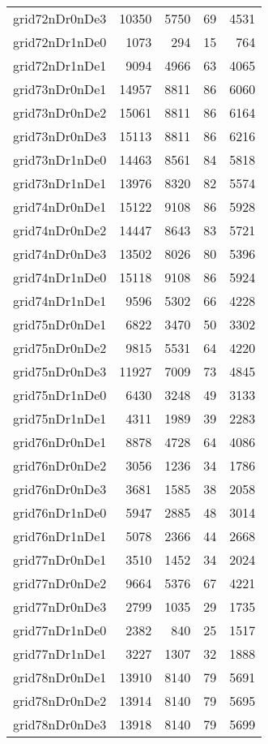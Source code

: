 \begin{longtable}{lrrrr}
grid72nDr0nDe3 & 10350 & 5750 & 69 & 4531 \\
grid72nDr1nDe0 & 1073 & 294 & 15 & 764 \\
grid72nDr1nDe1 & 9094 & 4966 & 63 & 4065 \\
grid73nDr0nDe1 & 14957 & 8811 & 86 & 6060 \\
grid73nDr0nDe2 & 15061 & 8811 & 86 & 6164 \\
grid73nDr0nDe3 & 15113 & 8811 & 86 & 6216 \\
grid73nDr1nDe0 & 14463 & 8561 & 84 & 5818 \\
grid73nDr1nDe1 & 13976 & 8320 & 82 & 5574 \\
grid74nDr0nDe1 & 15122 & 9108 & 86 & 5928 \\
grid74nDr0nDe2 & 14447 & 8643 & 83 & 5721 \\
grid74nDr0nDe3 & 13502 & 8026 & 80 & 5396 \\
grid74nDr1nDe0 & 15118 & 9108 & 86 & 5924 \\
grid74nDr1nDe1 & 9596 & 5302 & 66 & 4228 \\
grid75nDr0nDe1 & 6822 & 3470 & 50 & 3302 \\
grid75nDr0nDe2 & 9815 & 5531 & 64 & 4220 \\
grid75nDr0nDe3 & 11927 & 7009 & 73 & 4845 \\
grid75nDr1nDe0 & 6430 & 3248 & 49 & 3133 \\
grid75nDr1nDe1 & 4311 & 1989 & 39 & 2283 \\
grid76nDr0nDe1 & 8878 & 4728 & 64 & 4086 \\
grid76nDr0nDe2 & 3056 & 1236 & 34 & 1786 \\
grid76nDr0nDe3 & 3681 & 1585 & 38 & 2058 \\
grid76nDr1nDe0 & 5947 & 2885 & 48 & 3014 \\
grid76nDr1nDe1 & 5078 & 2366 & 44 & 2668 \\
grid77nDr0nDe1 & 3510 & 1452 & 34 & 2024 \\
grid77nDr0nDe2 & 9664 & 5376 & 67 & 4221 \\
grid77nDr0nDe3 & 2799 & 1035 & 29 & 1735 \\
grid77nDr1nDe0 & 2382 & 840 & 25 & 1517 \\
grid77nDr1nDe1 & 3227 & 1307 & 32 & 1888 \\
grid78nDr0nDe1 & 13910 & 8140 & 79 & 5691 \\
grid78nDr0nDe2 & 13914 & 8140 & 79 & 5695 \\
grid78nDr0nDe3 & 13918 & 8140 & 79 & 5699 \\

\end{longtable}
